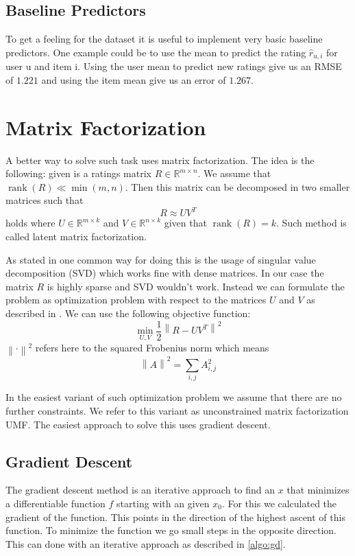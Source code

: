 \documentclass[DIV=14,twocolumn]{scrartcl}
\DeclareMathOperator{\rank}{rank}
\newcommand{\norm}[1]{\left\lVert#1\right\rVert}
\begin{document}
\subsection{Baseline Predictors}
To get a feeling for the dataset it is useful to implement very basic baseline predictors. One example could be to use the mean to predict the rating $\hat{r}_{u,i}$ for user u and item i. Using the user mean to predict new ratings give us an RMSE of $1.221$ and using the item mean give us an error of $1.267$.

\section{Matrix Factorization}
A better way to solve such task uses matrix factorization. The idea is the following: given is a ratings matrix $R\in\mathbb{R}^{m\times n}$. We assume that $\rank(R)\ll\min(m,n)$. Then this matrix can be decomposed in two smaller matrices such that 
$$R\approx UV^T$$ holds where $U\in\mathbb{R}^{m\times k}$ and $V\in\mathbb{R}^{n\times k}$ given that $\rank(R)=k$. Such method is called latent matrix factorization.

As stated in \cite{KoBeVo09} one common way for doing this is the usage of singular value decomposition (SVD) which works fine with dense matrices. In our case the matrix $R$ is highly sparse and SVD wouldn't work. Instead we can formulate the problem as optimization problem with respect to the matrices $U$ and $V$ as described in \cite{Ag16}. We can use the following objective function: 
$$\min_{U,V} \frac{1}{2}\norm{R-UV^T}^2$$ 
$\norm{\cdot}^2$ refers here to the squared Frobenius norm which means $$\norm{A}^2=\sum_{i,j}A_{i,j}^2$$

In the easiest variant of such optimization problem we assume that there are no further constraints. We refer to this variant as unconstrained matrix factorization UMF. The easiest approach to solve this uses gradient descent.

\subsection{Gradient Descent}\label{gd}
The gradient descent method is an iterative approach to find an $x$ that minimizes a differentiable function $f$ starting with an given $x_0$. For this we calculated the gradient of the function. This points in the direction of the highest ascent of this function. To minimize the function we go small steps in the opposite direction. This can done with an iterative approach as described in \ref{algo:gd}. 
\end{document}
